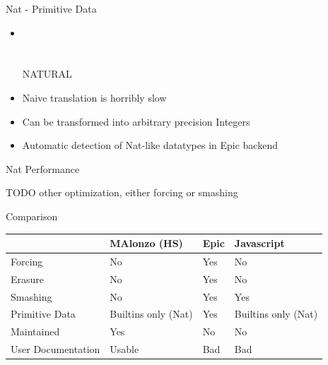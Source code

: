 \begin{frame}[fragile]{Nat - Primitive Data}
\begin{itemize}
\item \begin{code}%
\>  \AgdaSymbol{:}  \<%
\\
\>[0]\<[2]%
\>[2] \AgdaSymbol{:} \<%
\\
\>[0]\<[2]%
\>[2] \AgdaSymbol{:}  \AgdaSymbol{->} \<%
\\
\>\AgdaSymbol{\{-\#}  NATURAL  \AgdaSymbol{\#-\}}\<%
\\
\>\<%
\end{code}
\item Naive translation is horribly slow
\item Can be transformed into arbitrary precision Integers
\item Automatic detection of Nat-like datatypes in Epic backend
\end{itemize}
\end{frame}


\pgfplotsset{compat=1.8}
\mytable

\begin{frame}{Nat Performance}
\end{frame}

\begin{frame}{TODO}
other optimization, either forcing or smashing
\end{frame}

\begin{frame}[fragile]{Comparison}
\begin{tabular}{l | l | l | l}
& MAlonzo (HS) & Epic & Javascript \\
\hline
Forcing & No & Yes & No \\
Erasure & No & Yes & No \\
Smashing & No & Yes & Yes \\
Primitive Data & Builtins only (Nat) & Yes & Builtins only (Nat) \\
\hline
Maintained & Yes & No & No \\
User Documentation & Usable & Bad & Bad \\
\hline
\end{tabular}
\end{frame}
